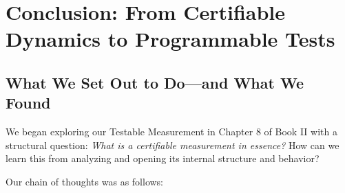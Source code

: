 \documentclass[12pt]{article}
\theoremstyle{definition}
\theoremstyle{plain}
\begin{document}
\section{Conclusion: From Certifiable Dynamics to Programmable Tests}
\label{sec:ch1-conclusion}

\subsection{What We Set Out to Do—and What We Found}

We began exploring our Testable Measurement in Chapter 8 of Book II with a structural question: \emph{What is a certifiable measurement in essence?} How can we learn this from analyzing and opening its internal structure and behavior?

Our chain of thoughts was as follows:
\end{document}
